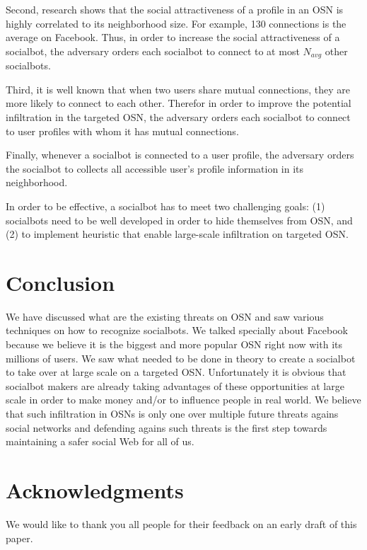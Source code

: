 \documentclass[12pt,a4paper]{article}
\begin{document}
  Second, research shows that the social attractiveness of a profile in an OSN is highly correlated
  to its neighborhood size. For example, 130 connections is the average on Facebook. Thus, in order
  to increase the social attractiveness of a socialbot, the adversary orders each socialbot to
  connect to at most $N_{avg}$ other socialbots.

  Third, it is well known that when two users share mutual connections, they are more likely to
  connect to each other. Therefor in order to improve the potential infiltration in the targeted
  OSN, the adversary orders each socialbot to connect to user profiles with whom it has mutual
  connections.

  Finally, whenever a socialbot is connected to a user profile, the adversary orders the socialbot
  to collects all accessible user's profile information in its neighborhood.

  In order to be effective, a socialbot has to meet two challenging goals: (1) socialbots need to
  be well developed in order to hide themselves from OSN, and (2) to implement heuristic that
  enable large-scale infiltration on targeted OSN.\cite{socialbot_network}

\section{Conclusion}
We have discussed what are the existing threats on OSN and saw various techniques on how to
recognize socialbots. We talked specially about Facebook because we believe it is the biggest
and more popular OSN right now with its millions of users. We saw what needed to be done in theory
to create a socialbot to take over at large scale on a targeted OSN. Unfortunately it is obvious
that socialbot makers are already taking advantages of these opportunities at large scale in order
to make money and/or to influence people in real world. We believe that such infiltration in OSNs
is only one over multiple future threats agains social networks and defending agains such threats
is the first step towards maintaining a safer social Web for all of us.

\section{Acknowledgments}
We would like to thank you all people for their feedback on an early draft of this paper.

\newpage

{}

\end{document}
